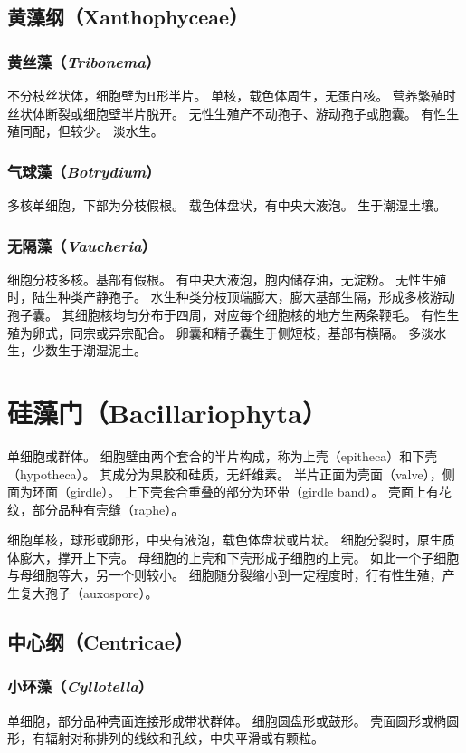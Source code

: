 \documentclass[11pt]{article}
\begin{document}
\subsection{黄藻纲（Xanthophyceae）}
\subsubsection{黄丝藻（\textit{Tribonema}）}
不分枝丝状体，细胞壁为H形半片。
单核，载色体周生，无蛋白核。
营养繁殖时丝状体断裂或细胞壁半片脱开。
无性生殖产不动孢子、游动孢子或胞囊。
有性生殖同配，但较少。
淡水生。

\subsubsection{气球藻（\textit{Botrydium}）}
多核单细胞，下部为分枝假根。
载色体盘状，有中央大液泡。
生于潮湿土壤。

\subsubsection{无隔藻（\textit{Vaucheria}）}
细胞分枝多核。基部有假根。
有中央大液泡，胞内储存油，无淀粉。
无性生殖时，陆生种类产静孢子。
水生种类分枝顶端膨大，膨大基部生隔，形成多核游动孢子囊。
其细胞核均匀分布于四周，对应每个细胞核的地方生两条鞭毛。
有性生殖为卵式，同宗或异宗配合。
卵囊和精子囊生于侧短枝，基部有横隔。
多淡水生，少数生于潮湿泥土。

\section{硅藻门（Bacillariophyta）}
单细胞或群体。
细胞壁由两个套合的半片构成，称为上壳（epitheca）和下壳（hypotheca）。
其成分为果胶和硅质，无纤维素。
半片正面为壳面（valve），侧面为环面（girdle）。
上下壳套合重叠的部分为环带（girdle band）。
壳面上有花纹，部分品种有壳缝（raphe）。

\newline

细胞单核，球形或卵形，中央有液泡，载色体盘状或片状。
细胞分裂时，原生质体膨大，撑开上下壳。
母细胞的上壳和下壳形成子细胞的上壳。
如此一个子细胞与母细胞等大，另一个则较小。
细胞随分裂缩小到一定程度时，行有性生殖，产生复大孢子（auxospore）。

\subsection{中心纲（Centricae）}
\subsubsection{小环藻（\textit{Cyllotella}）}
单细胞，部分品种壳面连接形成带状群体。
细胞圆盘形或鼓形。
壳面圆形或椭圆形，有辐射对称排列的线纹和孔纹，中央平滑或有颗粒。
\end{document}
